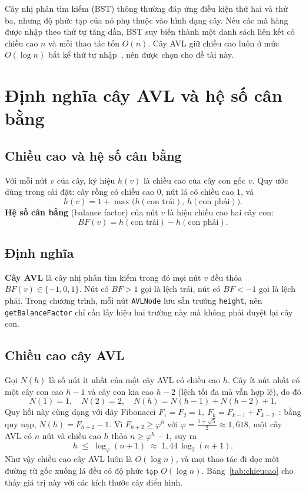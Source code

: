 Cây nhị phân tìm kiếm (BST) thông thường đáp ứng điều kiện thứ hai và thứ ba,
nhưng độ phức tạp của nó phụ thuộc vào hình dạng cây. Nếu các mã hàng được nhập
theo thứ tự tăng dần, BST suy biến thành một danh sách liên kết có chiều cao
$n$ và mỗi thao tác tốn $O(n)$. Cây AVL giữ chiều cao luôn ở mức $O(\log n)$
bất kể thứ tự nhập~\cite{adelson,clrs}, nên được chọn cho đề tài này.

\section{Định nghĩa cây AVL và hệ số cân bằng}\label{sec:avl-dinhnghia}

\subsection{Chiều cao và hệ số cân bằng}

Với mỗi nút $v$ của cây, ký hiệu $h(v)$ là chiều cao của cây con gốc $v$. Quy ước
dùng trong cài đặt: cây rỗng có chiều cao $0$, nút lá có chiều cao $1$, và
\[
  h(v) = 1 + \max\bigl(h(\text{con trái}),\, h(\text{con phải})\bigr).
\]
\textbf{Hệ số cân bằng} (balance factor) của nút $v$ là hiệu chiều cao hai cây con:
\[
  BF(v) = h(\text{con trái}) - h(\text{con phải}).
\]

\subsection{Định nghĩa}

\textbf{Cây AVL} là cây nhị phân tìm kiếm trong đó mọi nút $v$ đều thỏa
$BF(v) \in \{-1, 0, 1\}$. Nút có $BF > 1$ gọi là lệch trái, nút có $BF < -1$
gọi là lệch phải. Trong chương trình, mỗi nút \texttt{AVLNode} lưu sẵn trường
\texttt{height}, nên \texttt{getBalanceFactor} chỉ cần lấy hiệu hai trường này
mà không phải duyệt lại cây con.

\subsection{Chiều cao cây AVL}\label{sec:avl-chieucao}

Gọi $N(h)$ là số nút ít nhất của một cây AVL có chiều cao $h$. Cây ít nút nhất
có một cây con cao $h-1$ và cây con kia cao $h-2$ (lệch tối đa mà vẫn hợp lệ),
do đó
\[
  N(1) = 1,\quad N(2) = 2,\quad N(h) = N(h-1) + N(h-2) + 1 .
\]
Quy hồi này cùng dạng với dãy Fibonacci $F_1 = F_2 = 1,\ F_k = F_{k-1} + F_{k-2}$~\cite{knuth}:
bằng quy nạp, $N(h) = F_{h+2} - 1$. Vì $F_{h+2} \ge \varphi^{h}$ với
$\varphi = \frac{1+\sqrt5}{2} \approx 1{,}618$, một cây AVL có $n$ nút và chiều
cao $h$ thỏa $n \ge \varphi^{h} - 1$, suy ra
\[
  h \;\le\; \log_{\varphi}(n+1) \;\approx\; 1{,}44 \,\log_2 (n+1).
\]
Như vậy chiều cao cây AVL luôn là $O(\log n)$, và mọi thao tác đi dọc một đường
từ gốc xuống lá đều có độ phức tạp $O(\log n)$. Bảng~\ref{tab:chieucao} cho
thấy giá trị này với các kích thước cây điển hình.

